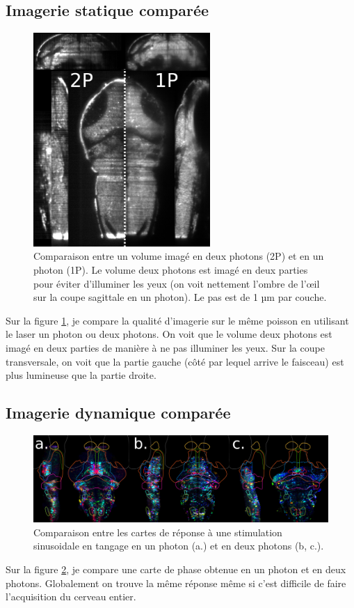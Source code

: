 \subsection{Imagerie statique comparée}

\begin{figure}
\centering
\includegraphics[width=0.6\textwidth]{./files/graystack_1P-2P.svg.png}
\caption{Comparaison entre un volume imagé en deux photons (2P) et en un photon (1P). Le volume deux photons est imagé en deux parties pour éviter d'illuminer les yeux (on voit nettement l'ombre de l'œil sur la coupe sagittale en un photon). Le pas est de 1 µm par couche.
\label{FIG1P2Pgraystack}}
\end{figure}

Sur la figure \ref{FIG1P2Pgraystack}, je compare la qualité d'imagerie sur le même poisson en utilisant le laser un photon ou deux photons. On voit que le volume deux photons est imagé en deux parties de manière à ne pas illuminer les yeux. Sur la coupe transversale, on voit que la partie gauche (côté par lequel arrive le faisceau) est plus lumineuse que la partie droite.

\subsection{Imagerie dynamique comparée}

\begin{figure}
\centering
\includegraphics[width=\textwidth]{./files/1P-2P_tilt.svg.png}
\caption{Comparaison entre les cartes de réponse à une stimulation sinusoidale en tangage en un photon (a.) et en deux photons (b, c.).
\label{FIG1P2Ptilt}}
\end{figure}

Sur la figure \ref{FIG1P2Ptilt}, je compare une carte de phase obtenue en un photon et en deux photons. Globalement on trouve la même réponse même si c'est difficile de faire l'acquisition du cerveau entier.
